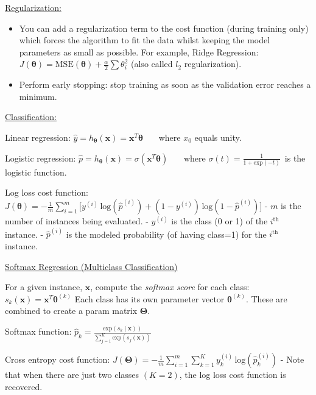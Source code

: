 \underline{Regularization:}
\vspace{-3.0mm}
\begin{itemize}
\item
You can add a regularization term to the cost function (during training only)
which forces the algorithm to fit the data whilst keeping the model parameters as small as possible.\newline
For example, Ridge Regression:
$J(\boldsymbol{\theta}) = \textrm{MSE}(\boldsymbol{\theta}) + \frac{\alpha}{2}\sum \theta_i^2$
(also called $l_2$ regularization).
\item
Perform early stopping: stop training as soon as the validation error reaches a minimum.
\end{itemize}

\underline{Classification:}

Linear regression:
$\hat{y} = h_{\boldsymbol{\theta}}(\boldsymbol{x}) = \boldsymbol{x}^{T} \boldsymbol{\theta}$
~~~where $x_0$ equals unity.

Logistic regression:
$\hat{p} = h_{\boldsymbol{\theta}}(\boldsymbol{x}) = \sigma({\boldsymbol{x}^{T} \boldsymbol{\theta}})$
~~~where $\sigma(t) = \frac{1}{1+\textrm{exp}(-t)}$~is the logistic function.

Log loss cost function:
$J(\boldsymbol{\theta}) = - \frac{1}{m} \sum_{i=1}^{m} \big[ y^{(i)} \, \textrm{log}(\hat{p}^{(i)}) + (1 - y^{(i)}) \, \textrm{log}(1 - \hat{p}^{(i)}) \big]$\newline
- $m$ is the number of instances being evaluated.\newline
- $y^{(i)}$ is the class (0 or 1) of the $i^{\textrm{th}}$ instance.\newline
- $\hat{p}^{(i)}$ is the modeled probability (of having class=1) for the $i^{\textrm{th}}$ instance.\newline

\underline{Softmax Regression (Multiclass Classification)}

For a given instance, $\boldsymbol{x}$, compute the \textit{softmax score} for each class:
$s_k(\boldsymbol{x}) = \boldsymbol{x}^T \boldsymbol{\theta}^{(k)}$\newline
Each class has its own parameter vector $\boldsymbol{\theta}^{(k)}$.
These are combined to create a param matrix $\boldsymbol{\Theta}$.

Softmax function:
$\hat{p}_k = \frac{\textrm{exp}(s_k(\boldsymbol{x}))}{\sum_{j=1}^{K} \textrm{exp}(s_j(\boldsymbol{x}))}$

Cross entropy cost function:
$J(\boldsymbol{\Theta}) = - \frac{1}{m} \sum_{i=1}^{m} \sum_{k=1}^{K} y_k^{(i)}\, \textrm{log}(\hat{p}_k^{(i)})$\newline
- Note that when there are just two classes $(K=2)$, the log loss cost function is recovered.

\newpage